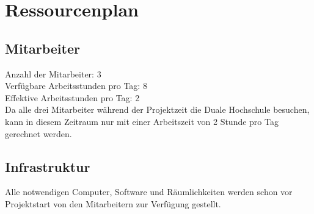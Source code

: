 \section{Ressourcenplan}
\subsection{Mitarbeiter}
Anzahl der Mitarbeiter: 3 \\

\noindent Verfügbare Arbeitsstunden pro Tag: 8 \\

\noindent Effektive Arbeitsstunden pro Tag: 2 \\

\noindent Da alle drei Mitarbeiter während der Projektzeit die Duale Hochschule besuchen, kann in diesem Zeitraum nur mit einer Arbeitszeit von 2 Stunde pro Tag gerechnet werden.

\subsection{Infrastruktur}
Alle notwendigen Computer, Software und Räumlichkeiten werden schon vor Projektstart von den Mitarbeitern zur Verfügung gestellt.
